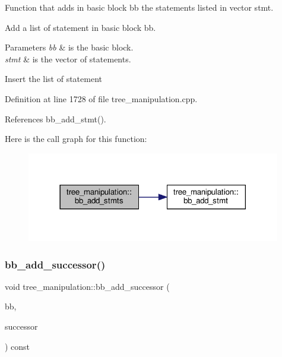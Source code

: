 Function that adds in basic block bb the statements listed in vector stmt. 

Add a list of statement in basic block bb.


\begin{DoxyParams}{Parameters}
{\em bb} & is the basic block. \\
\hline
{\em stmt} & is the vector of statements. \\
\hline
\end{DoxyParams}
Insert the list of statement 

Definition at line 1728 of file tree\+\_\+manipulation.\+cpp.



References bb\+\_\+add\+\_\+stmt().

Here is the call graph for this function\+:
\nopagebreak
\begin{figure}[H]
\begin{center}
\leavevmode
\includegraphics[width=314pt]{d0/d99/classtree__manipulation_a0c96350236e7fb3907632d38aeac9ade_cgraph}
\end{center}
\end{figure}
\mbox{\label{classtree__manipulation_aa16ba8350ff32b94146aba631fc1bea6}} 
\subsubsection{\texorpdfstring{bb\+\_\+add\+\_\+successor()}{bb\_add\_successor()}}
{\footnotesize\ttfamily void tree\+\_\+manipulation\+::bb\+\_\+add\+\_\+successor (\begin{DoxyParamCaption}\item[{bloc\+Ref \&}]{bb,  }\item[{const unsigned int \&}]{successor }\end{DoxyParamCaption}) const}



